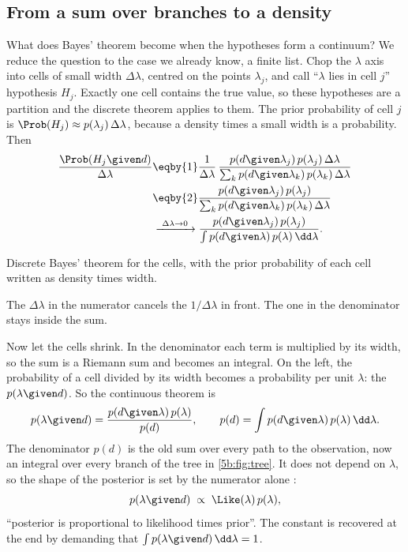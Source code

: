 \subsection{From a sum over branches to a density}

What does Bayes' theorem become when the hypotheses form a continuum? We reduce the
question to the case we already know, a finite list. Chop the $\lambda$ axis into cells
of small width $\Delta\lambda$, centred on the points $\lambda_j$, and call
``$\lambda$ lies in cell $j$'' hypothesis $H_j$. Exactly one cell contains the true
value, so these hypotheses are a partition and the discrete theorem applies to them.
The prior probability of cell $j$ is $\Prob(H_j)\approx p(\lambda_j)\,\Delta\lambda$,
because a density times a small width is a probability. Then
\begin{align}
  \frac{\Prob(H_j\given d)}{\Delta\lambda}
  &\eqby{1}\frac{1}{\Delta\lambda}\,
     \frac{p(d\given\lambda_j)\,p(\lambda_j)\,\Delta\lambda}
          {\sum_k p(d\given\lambda_k)\,p(\lambda_k)\,\Delta\lambda}
   \nonumber\\
  &\eqby{2}\frac{p(d\given\lambda_j)\,p(\lambda_j)}
          {\sum_k p(d\given\lambda_k)\,p(\lambda_k)\,\Delta\lambda}
   \nonumber\\
  &\xrightarrow{\ \Delta\lambda\to0\ }
   \frac{p(d\given\lambda_j)\,p(\lambda_j)}{\int p(d\given\lambda)\,p(\lambda)\,\dd\lambda} .
  \label{5b:eq:bayes-cont}
\end{align}
\begin{explain}
  \item Discrete Bayes' theorem for the cells, with the prior probability of each cell
        written as density times width.
  \item The $\Delta\lambda$ in the numerator cancels the $1/\Delta\lambda$ in front.
        The one in the denominator stays inside the sum.
\end{explain}
Now let the cells shrink. In the denominator each term is multiplied by its width, so
the sum is a Riemann sum and becomes an integral. On the left, the probability of a cell
divided by its width becomes a probability per unit $\lambda$: the
 $p(\lambda\given d)$. So the continuous theorem is
\begin{equation}
  p(\lambda\given d)=\frac{p(d\given\lambda)\,p(\lambda)}{p(d)},\qquad
  p(d)=\int p(d\given\lambda)\,p(\lambda)\,\dd\lambda .
  \label{5b:eq:bayes}
\end{equation}
The denominator $p(d)$ is the old sum over every path to the observation, now an
integral over every branch of the tree in \cref{5b:fig:tree}. It does not depend on
$\lambda$, so the shape of the posterior is set by the numerator alone
:
\begin{equation}
  p(\lambda\given d)\;\propto\;\Like(\lambda)\,p(\lambda),
  \label{5b:eq:prop}
\end{equation}
``posterior is proportional to likelihood times prior''. The constant is recovered at
the end by demanding that $\int p(\lambda\given d)\,\dd\lambda=1$.

